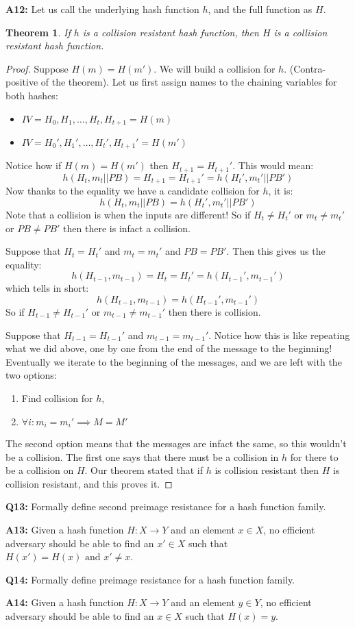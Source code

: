 \documentclass[12pt,reqno]{amsart}
\newcommand{\mand}[0]{\text{ and }}
\newtheorem{theorem}{Theorem}[section]
\begin{document}
\textbf{A12:} Let us call the underlying hash function $h$, and the full function as $H$. 
\begin{theorem} 
If $h$ is a collision resistant hash function, then $H$ is a collision resistant hash function.
\end{theorem}
\begin{proof}
Suppose $H(m) = H(m')$. We will build a collision for $h$. (Contra-positive of the theorem). Let us first assign names to the chaining variables for both hashes:
\begin{itemize}
	\item $IV = H_0, H_1, \ldots, H_t , H_{t+1} = H(m)$	
	\item $IV = H_0', H_1', \ldots, H_t' , H_{t+1}' = H(m')$
\end{itemize}
Notice how if $H(m)=H(m')$ then $H_{t+1}=H_{t+1}'$. This would mean:
$$
h(H_t, m_t || PB) = H_{t+1} = H_{t+1}' = h(H_t', m_t' || PB')
$$
Now thanks to the equality we have a candidate collision for $h$, it is:
$$
h(H_t, m_t || PB) = h(H_t', m_t' || PB')
$$
Note that a collision is when the inputs are different! So if $H_t \ne H_t'$ or $m_t \ne m_t'$ or $PB \ne PB'$ then there is infact a collision.

Suppose that $H_t = H_t'$ and $m_t = m_t'$ and $PB = PB'$. Then this gives us the equality:
$$
h(H_{t-1}, m_{t-1}) = H_t = H_t' = h(H_{t-1}', m_{t-1}')
$$
which tells in short:
$$
h(H_{t-1}, m_{t-1}) = h(H_{t-1}', m_{t-1}')
$$
So if $H_{t-1} \ne H_{t-1}'$ or $m_{t-1} \ne m_{t-1}'$ then there is collision. 

Suppose that $H_{t-1}=H_{t-1}'$ and $m_{t-1}=m_{t-1}'$. Notice how this is like repeating what we did above, one by one from the end of the message to the beginning! Eventually we iterate to the beginning of the messages, and we are left with the two options:
\begin{enumerate}
	\item Find collision for $h$,
	\item $\forall i: m_i=m_i' \implies M = M'$
\end{enumerate}
The second option means that the messages are infact the same, so this wouldn't be a collision. The first one says that there must be a collision in $h$ for there to be a collision on $H$. Our theorem stated that if $h$ is collision resistant then $H$ is collision resistant, and this proves it.
\end{proof}

\vspace{20px}
\textbf{Q13:} Formally define second preimage resistance for a hash function family.

\textbf{A13:} Given a hash function $H : X \xrightarrow{} Y$ and an element $x \in X$, no efficient adversary should be able to find an $x' \in X$ such that $H(x')=H(x) \mand x' \ne x$.

\vspace{20px}
\textbf{Q14:} Formally define preimage resistance for a hash function family.

\textbf{A14:} Given a hash function $H : X \xrightarrow{} Y$ and an element $y \in Y$, no efficient adversary should be able to find an $x \in X$ such that $H(x)=y$.
\end{document}
